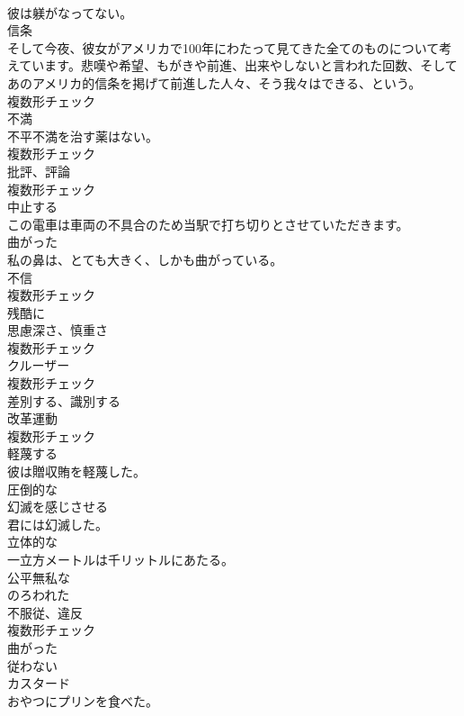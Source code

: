\documentclass[8pt]{extreport}
\begin{document}
\begin{CJK}{UTF8}{min}
\\	彼は躾がなってない。	
\\	[名詞]	信条	
\\	そして今夜、彼女がアメリカで100年にわたって見てきた全てのものについて考えています。悲嘆や希望、もがきや前進、出来やしないと言われた回数、そしてあのアメリカ的信条を掲げて前進した人々、そう我々はできる、という。	
\\	複数形チェック
\\	[名詞]	不満	
\\	不平不満を治す薬はない。	
\\	複数形チェック
\\	[名詞]	批評、評論	
\\	複数形チェック
\\	[動詞]	中止する	
\\	この電車は車両の不具合のため当駅で打ち切りとさせていただきます。	
\\	[形容詞]	曲がった	
\\	私の鼻は、とても大きく、しかも曲がっている。	
\\	[名詞]	不信	
\\	複数形チェック
\\	[副詞]	残酷に	
\\	[名詞]	思慮深さ、慎重さ	
\\	複数形チェック
\\	[名詞]	クルーザー	
\\	複数形チェック
\\	[動詞]	差別する、識別する	
\\	[名詞]	改革運動	
\\	複数形チェック
\\	[動詞]	軽蔑する	
\\	彼は贈収賄を軽蔑した。	
\\	[形容詞]	圧倒的な	
\\	[動詞]	幻滅を感じさせる	
\\	君には幻滅した。	
\\	[形容詞]	立体的な	
\\	一立方メートルは千リットルにあたる。	
\\	[形容詞]	公平無私な	
\\	[形容詞]	のろわれた	
\\	[名詞]	不服従、違反	
\\	複数形チェック
\\	[形容詞]	曲がった	
\\	[動詞]	従わない	
\\	[名詞]	カスタード	
\\	おやつにプリンを食べた。	

\end{CJK}
\end{document}

